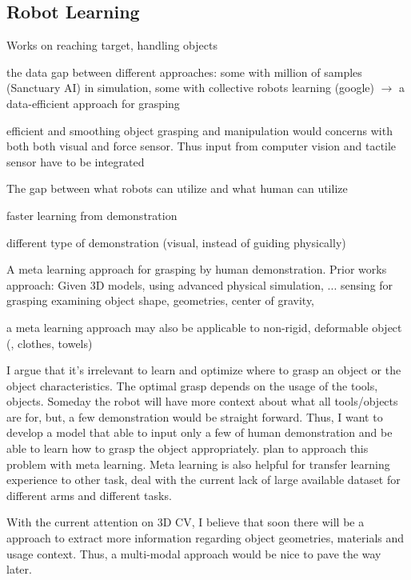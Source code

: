 
\cite{calandra2017feeling} 

\subsection{Robot Learning}
Works on reaching target, handling objects

the data gap between different approaches: some with million of samples (Sanctuary AI) in simulation, some with collective robots learning (google) $\rightarrow$ a data-efficient approach for grasping

efficient and smoothing object grasping and manipulation would concerns with both both visual and force sensor. Thus input from computer vision and tactile sensor have to be integrated \cite{haddadin2018tactile}

The gap between what robots can utilize and what human can utilize

faster learning from demonstration

different type of demonstration (visual, instead of guiding physically)

A meta learning approach for grasping by human demonstration. Prior works approach:
Given 3D models, using advanced physical simulation, ...
sensing for grasping
examining object shape, geometries, center of gravity, \etc

a meta learning approach may also be applicable to non-rigid, deformable object (\eg, clothes, towels)

I argue that it's irrelevant to learn and optimize where to grasp an object or the object characteristics. The optimal grasp depends on the usage of the tools, objects. Someday the robot will have more context about what all tools/objects are for, but, a few demonstration would be straight forward. Thus, I want to develop a model that able to input only a few of human demonstration and be able to learn how to grasp the object appropriately.
plan to approach this problem with meta learning. Meta learning is also helpful for transfer learning experience to other task, deal with the current lack of large available dataset for different arms and different tasks.

With the current attention on 3D CV, I believe that soon there will be a approach to extract more information regarding object geometries, materials and usage context. Thus, a multi-modal approach would be nice to pave the way later.

